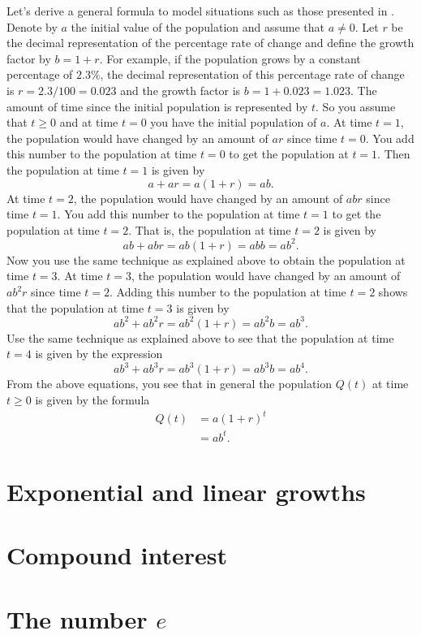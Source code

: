 \documentclass[a4paper,oneside,12pt]{article}
\begin{document}
Let's derive a general formula to model situations such as those
presented in .  Denote by $a$
the initial value of the population and assume that $a \neq 0$.  Let
$r$ be the decimal representation of the percentage rate of change and
define the growth factor by $b = 1 + r$.  For example, if the
population grows by a constant percentage of $2.3\%$, the decimal
representation of this percentage rate of change is
$r = 2.3 / 100 = 0.023$ and the growth factor is
$b = 1 + 0.023 = 1.023$.  The amount of time since the initial
population is represented by $t$.  So you assume that $t \geq 0$ and
at time $t = 0$ you have the initial population of $a$.  At time
$t = 1$, the population would have changed by an amount of $ar$ since
time $t = 0$.  You add this number to the population at time $t = 0$
to get the population at $t = 1$.  Then the population at time $t = 1$
is given by
\[
a + ar
=
a(1 + r)
=
ab.
\]
At time $t = 2$, the population would have changed by an amount of
$abr$ since time $t = 1$.  You add this number to the population at
time $t = 1$ to get the population at time $t = 2$.  That is, the
population at time $t = 2$ is given by
\[
ab + abr
=
ab(1 + r)
=
abb
=
ab^2.
\]
Now you use the same technique as explained above to obtain the
population at time $t = 3$.  At time $t = 3$, the population would
have changed by an amount of $ab^2r$ since time $t = 2$.  Adding this
number to the population at time $t = 2$ shows that the population at
time $t = 3$ is given by
\[
ab^2 + ab^2r
=
ab^2 (1 + r)
=
ab^2b
=
ab^3.
\]
Use the same technique as explained above to see that the population
at time $t = 4$ is given by the expression
\[
ab^3 + ab^3r
=
ab^3 (1 + r)
=
ab^3b
=
ab^4.
\]
From the above equations, you see that in general the population
$Q(t)$ at time $t \geq 0$ is given by the formula
\begin{align*}
Q(t)
&=
a(1 + r)^t \\[4pt]
&=
ab^t.
\end{align*}




\section{Exponential and linear growths}



\section{Compound interest}



\section{The number $e$}
\end{document}

